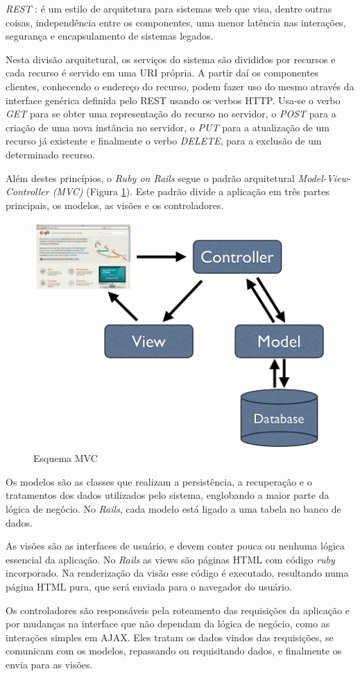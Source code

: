 \textit{REST} \cite{FIELDING}: é um estilo de arquitetura para sistemas web que visa, dentre outras coisas, independência entre os componentes, uma menor latência nas interações, segurança e encapsulamento de sistemas legados.

Nesta divisão arquitetural, os serviços do sistema são divididos por recursos e cada recurso é servido em uma URI própria. A partir daí os componentes clientes, conhecendo o endereço do recurso, podem fazer uso do mesmo através da interface genérica definida pelo REST usando os verbos HTTP. Usa-se o verbo \textit{GET} para se obter uma representação do recurso no servidor, o \textit{POST} para a criação de uma nova instância no servidor, o \textit{PUT} para a atualização de um recurso já existente e finalmente o verbo \textit{DELETE}, para a exclusão de um determinado recurso.

Além destes princípios, o \textit{Ruby on Rails} segue o padrão arquitetural \textit{Model-View-Controller (MVC)} (Figura \ref{figura_23}). Este padrão divide a aplicação em três partes principais, os modelos, as visões e os controladores.

\begin{figure}[ht]
    \centering
    \includegraphics[width=0.83 \textwidth]{figuras/mvc}
    \caption{Esquema MVC}
    \label{figura_23}
\end{figure}

Os modelos são as classes que realizam a persistência, a recuperação e o tratamentos dos dados utilizados pelo sistema, englobando a maior parte da lógica de negócio. No \textit{Rails}, cada modelo está ligado a uma tabela no banco de dados.

As visões são as interfaces de usuário, e devem conter pouca ou nenhuma lógica essencial da aplicação. No \textit{Rails} as views são páginas HTML com código \textit{ruby} incorporado. Na renderização da visão esse código é executado, resultando numa página HTML pura, que será enviada para o navegador do usuário.

Os controladores são responsáveis pela roteamento das requisições da aplicação e por mudanças na interface que não dependam da lógica de negócio, como as interações simples em AJAX. Eles tratam os dados vindos das requisições, se comunicam com os modelos, repassando ou requisitando dados, e finalmente os envia para as visões.
